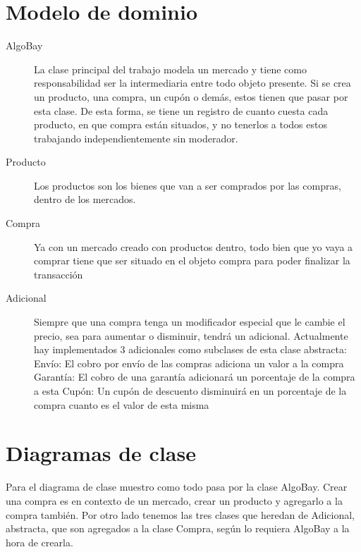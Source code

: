 \documentclass[titlepage,a4paper]{article}
\begin{document}
\section{Modelo de dominio}\label{sec:modelo}

\begin{description}
\item[AlgoBay] La clase principal del trabajo modela un mercado y tiene como responsabilidad ser la intermediaria entre todo objeto presente. Si se crea un producto, una compra, un cupón o demás, estos tienen que pasar por esta clase. De esta forma, se tiene un registro de cuanto cuesta cada producto, en que compra están situados, y no tenerlos a todos estos trabajando independientemente sin moderador.
\item[Producto] Los productos son los bienes que van a ser comprados por las compras, dentro de los mercados.
\item[Compra] Ya con un mercado creado con productos dentro, todo bien que yo vaya a comprar tiene que ser situado en el objeto compra para poder finalizar la transacción
\item[Adicional] Siempre que una compra tenga un modificador especial que le cambie el precio, sea para aumentar o disminuir, tendrá un adicional. Actualmente hay implementados 3 adicionales como subclases de esta clase abstracta:
\subitem Envío: El cobro por envío de las compras adiciona un valor a la compra
\subitem Garantía: El cobro de una garantía adicionará un porcentaje de la compra a esta
\subitem Cupón: Un cupón de descuento disminuirá en un porcentaje de la compra cuanto es el valor de esta misma
\end{description}

\section{Diagramas de clase}\label{sec:diagramasdeclase}

Para el diagrama de clase muestro como todo pasa por la clase AlgoBay. Crear una compra es en contexto de un mercado, crear un producto y agregarlo a la compra también. Por otro lado tenemos las tres clases que heredan de Adicional, abstracta, que son agregados a la clase Compra, según lo requiera AlgoBay a la hora de crearla.
\end{document}
